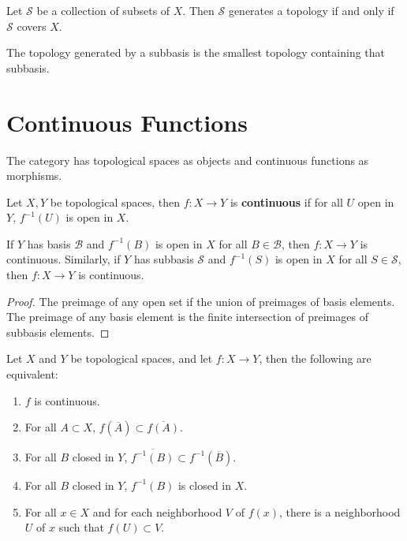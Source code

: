 \documentclass[twoside,10pt]{report}
\begin{document}
\begin{prop}
Let $\mathcal{S}$ be a collection of subsets of $X$. Then $\mathcal{S}$ generates a topology if and only if $\mathcal{S}$ covers $X$.
\end{prop}

\begin{prop}
The topology generated by a subbasis is the smallest topology containing that subbasis.
\end{prop}


\section{Continuous Functions}

The category  has topological spaces as objects and continuous functions as morphisms.

\begin{defn}
	Let $X,Y$ be topological spaces, then $f : X \to Y$ is \textbf{continuous} if for all $U$ open in $Y$, $f^{-1}(U)$ is open in $X$.
\end{defn}

\begin{prop}
	If $Y$ has basis $\mathcal{B}$ and $f^{-1}(B)$ is open in $X$ for all $B \in \mathcal{B}$, then $f: X \to Y$ is continuous.
	Similarly, if $Y$ has subbasis $\mathcal{S}$ and $f^{-1}(S)$ is open in $X$ for all $S \in \mathcal{S}$, then $f: X \to Y$ is continuous.
\end{prop}
\begin{proof}
	The preimage of any open set if the union of preimages of basis elements. The preimage of any basis element is the finite intersection of preimages of subbasis elements.
\end{proof}

\begin{thrm}
Let $X$ and $Y$ be topological spaces, and let $f: X \to Y$, then the following are equivalent:
\begin{enumerate}
	\item $f$ is continuous.
	\item For all $A \subset X$, $f(\overline{A}) \subset \overline{f(A)} $.
	\item For all $B$ closed in $Y$, $\overline{f^{-1}(B)} \subset f^{-1}(\overline{B})$.
	\item For all $B$ closed in $Y$, $f^{-1}(B)$ is closed in $X$.
	\item For all $x \in X$ and for each neighborhood $V$ of $f(x)$, there is a neighborhood $U$ of $x$ such that $f(U) \subset V$.
\end{enumerate}
\end{thrm}
\end{document}
